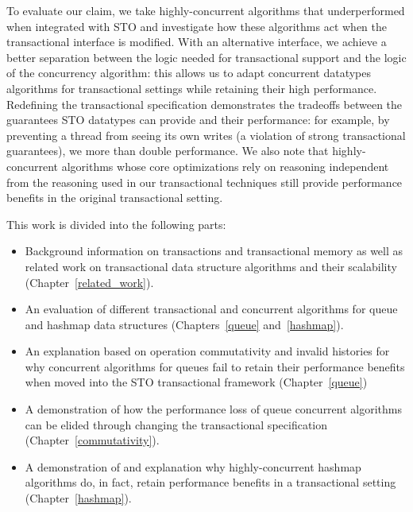 To evaluate our claim, we take highly-concurrent algorithms that underperformed when integrated with STO and investigate how these algorithms act when the transactional interface is modified. 
With an alternative interface, we achieve a better separation between the logic needed for transactional support and the logic of the concurrency algorithm: this allows us to adapt concurrent datatypes algorithms for transactional settings while retaining their high performance.
Redefining the transactional specification demonstrates the tradeoffs between the guarantees STO datatypes can provide and their performance: for example, by preventing a thread from seeing its own writes (a violation of strong transactional guarantees), we more than double performance.
We also note that highly-concurrent algorithms whose core optimizations rely on reasoning independent from the reasoning used in our transactional techniques still provide performance benefits in the original transactional setting.

This work is divided into the following parts: 
\begin{itemize}
    \item Background information on transactions and transactional memory as well as related work on transactional data structure algorithms and their scalability (Chapter~\ref{related_work}).
    \item An evaluation of different transactional and concurrent algorithms for queue and hashmap data structures (Chapters~\ref{queue} and~\ref{hashmap}).
    \item An explanation based on operation commutativity and invalid histories for why concurrent algorithms for queues fail to retain their performance benefits when moved into the STO transactional framework (Chapter~\ref{queue})
    \item A demonstration of how the performance loss of queue concurrent algorithms can be elided through changing the transactional specification (Chapter~\ref{commutativity}).
    \item A demonstration of and explanation why highly-concurrent hashmap algorithms do, in fact, retain performance benefits in a transactional setting (Chapter~\ref{hashmap}).
\end{itemize}
